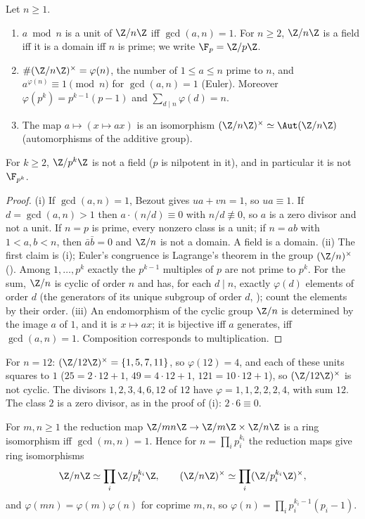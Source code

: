 \begin{proposition}\label{prop:rings:zn}
Let $n\ge1$.
\begin{enumerate}[label=(\roman*)]
\item $a\bmod n$ is a unit of $\Z/n\Z$ iff $\gcd(a,n)=1$. For $n\ge2$, $\Z/n\Z$ is a field iff it is a domain iff $n$ is prime; we write
$\F_p=\Z/p\Z$.
\item $\#(\Z/n\Z)^\times=\varphi(n)$, the number of $1\le a\le n$ prime to $n$, and $a^{\varphi(n)}\equiv1\pmod n$ for $\gcd(a,n)=1$ (Euler). Moreover
$\varphi(p^k)=p^{k-1}(p-1)$ and $\sum_{d\mid n}\varphi(d)=n$.
\item The map $a\mapsto(x\mapsto ax)$ is an isomorphism $(\Z/n\Z)^\times\simeq\Aut(\Z/n\Z)$ (automorphisms of the additive group).
\end{enumerate}
For $k\ge2$, $\Z/p^k\Z$ is not a field ($p$ is nilpotent in it), and in particular it is not $\F_{p^k}$.
\end{proposition}

\begin{proof}
(i) If $\gcd(a,n)=1$, Bezout gives $ua+vn=1$, so $ua\equiv1$. If $d=\gcd(a,n)>1$ then $a\cdot(n/d)\equiv0$ with $n/d\not\equiv0$, so $a$ is a zero divisor
and not a unit. If $n=p$ is prime, every nonzero class is a unit; if $n=ab$ with $1<a,b<n$, then $\bar a\bar b=0$ and $\Z/n$ is not a domain.
A field is a domain.
(ii) The first claim is (i); Euler's congruence is Lagrange's theorem in the group $(\Z/n)^\times$ (). Among $1,\dots,p^k$
exactly the $p^{k-1}$ multiples of $p$ are not prime to $p^k$. For the sum, $\Z/n$ is cyclic of order $n$ and has, for each $d\mid n$,
exactly $\varphi(d)$ elements of order $d$ (the generators of its unique subgroup of order $d$, ); count the
elements by their order.
(iii) An endomorphism of the cyclic group $\Z/n$ is determined by the image $a$ of $1$, and it is $x\mapsto ax$; it is bijective iff $a$
generates, iff $\gcd(a,n)=1$. Composition corresponds to multiplication.
\end{proof}

For $n=12$: $(\Z/12\Z)^\times=\{1,5,7,11\}$, so $\varphi(12)=4$, and each of these units squares to $1$ ($25=2\cdot12+1$, $49=4\cdot12+1$, $121=10\cdot12+1$), so
$(\Z/12\Z)^\times$ is not cyclic. The divisors $1,2,3,4,6,12$ of $12$ have $\varphi=1,1,2,2,2,4$, with sum $12$. The class $2$ is a zero divisor, as in the
proof of (i): $2\cdot6\equiv0$.

\begin{theorem}\label{thm:rings:crt}
For $m,n\ge1$ the reduction map $\Z/mn\Z\to\Z/m\Z\times\Z/n\Z$ is a ring isomorphism iff $\gcd(m,n)=1$. Hence for $n=\prod_ip_i^{k_i}$ the reduction maps
give ring isomorphisms
\[
\Z/n\Z\simeq\prod_i\Z/p_i^{k_i}\Z,\qquad(\Z/n\Z)^\times\simeq\prod_i(\Z/p_i^{k_i}\Z)^\times,
\]
and $\varphi(mn)=\varphi(m)\varphi(n)$ for coprime $m,n$, so $\varphi(n)=\prod_ip_i^{k_i-1}(p_i-1)$.
\end{theorem}

